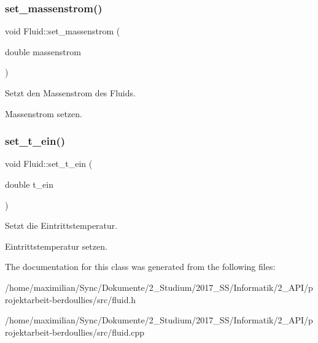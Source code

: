 \subsubsection{\texorpdfstring{set\+\_\+massenstrom()}{set\_massenstrom()}}
{\footnotesize\ttfamily void Fluid\+::set\+\_\+massenstrom (\begin{DoxyParamCaption}\item[{double}]{massenstrom }\end{DoxyParamCaption})}



Setzt den Massenstrom des Fluids. 

Massenstrom setzen. \mbox{\label{class_fluid_a9449846d8fd4bf31d8685eefa55d4a57}} 
\subsubsection{\texorpdfstring{set\+\_\+t\+\_\+ein()}{set\_t\_ein()}}
{\footnotesize\ttfamily void Fluid\+::set\+\_\+t\+\_\+ein (\begin{DoxyParamCaption}\item[{double}]{t\+\_\+ein }\end{DoxyParamCaption})}



Setzt die Eintrittstemperatur. 

Eintrittstemperatur setzen. 

The documentation for this class was generated from the following files\+:\begin{DoxyCompactItemize}
\item 
/home/maximilian/\+Sync/\+Dokumente/2\+\_\+\+Studium/2017\+\_\+\+S\+S/\+Informatik/2\+\_\+\+A\+P\+I/projektarbeit-\/berdoullies/src/fluid.\+h\item 
/home/maximilian/\+Sync/\+Dokumente/2\+\_\+\+Studium/2017\+\_\+\+S\+S/\+Informatik/2\+\_\+\+A\+P\+I/projektarbeit-\/berdoullies/src/fluid.\+cpp\end{DoxyCompactItemize}
